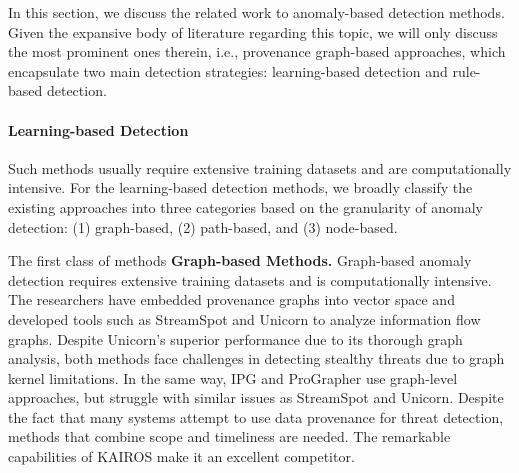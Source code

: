 

In this section, we discuss the related work to anomaly-based detection methods. Given the expansive body of literature regarding this topic, we will only discuss the most prominent ones therein, i.e., provenance graph-based approaches, which encapsulate two main detection strategies: learning-based detection and rule-based detection.


\paragraph{Learning-based Detection}
Such methods usually require extensive training datasets and are computationally intensive. For the learning-based detection methods, we broadly classify the existing approaches into three categories based on the granularity of anomaly detection: (1) graph-based, (2) path-based, and (3) node-based. %

% 

The first class of methods 
\noindent
{\bf Graph-based Methods.} Graph-based anomaly detection requires extensive training datasets and is computationally intensive. The researchers have embedded provenance graphs into vector space and developed tools such as StreamSpot \cite{manzoor2016fast} and Unicorn \cite{han2020unicorn} to analyze information flow graphs. Despite Unicorn's superior performance due to its thorough graph analysis, both methods face challenges in detecting stealthy threats due to graph kernel limitations. In the same way, IPG \cite{li2021hierarchical} and ProGrapher \cite{yang2023prographer} use graph-level approaches, but struggle with similar issues as StreamSpot and Unicorn. Despite the fact that many systems attempt to use data provenance for threat detection, methods that combine scope and timeliness are needed. The remarkable capabilities of KAIROS \cite{cheng2023kairos} make it an excellent competitor.


